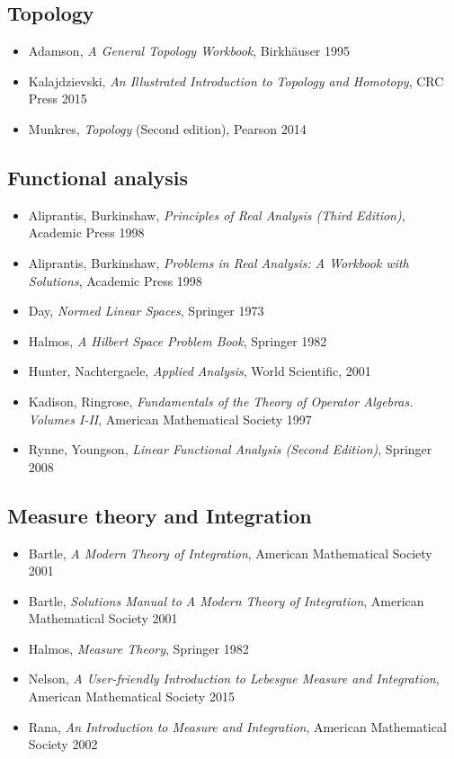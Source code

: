 \subsection*{Topology}

\begin{itemize}
\item Adamson, \textit{A General Topology Workbook}, Birkh\"auser 1995
\item Kalajdzievski, \textit{An Illustrated Introduction to Topology and Homotopy}, CRC Press 2015
\item Munkres, \textit{Topology} (Second edition), Pearson 2014
\end{itemize}


\subsection*{Functional analysis}

\begin{itemize}
\item Aliprantis, Burkinshaw, \textit{Principles of Real Analysis (Third Edition)}, Academic Press 1998
\item Aliprantis, Burkinshaw, \textit{Problems in Real Analysis: A Workbook with Solutions}, Academic Press 1998
\item Day, \textit{Normed Linear Spaces}, Springer 1973
\item Halmos, \textit{A Hilbert Space Problem Book}, Springer 1982
\item Hunter, Nachtergaele, \textit{Applied Analysis}, World Scientific, 2001
\item Kadison, Ringrose, \textit{Fundamentals of the Theory of Operator Algebras. Volumes I-II}, American Mathematical Society 1997
\item Rynne, Youngson, \textit{Linear Functional Analysis (Second Edition)}, Springer 2008
\end{itemize}


\subsection*{Measure theory and Integration}

\begin{itemize}
\item Bartle, \textit{A Modern Theory of Integration}, American Mathematical Society 2001
\item Bartle, \textit{Solutions Manual to A Modern Theory of Integration}, American Mathematical Society 2001
\item Halmos, \textit{Measure Theory}, Springer 1982
\item Nelson, \textit{A User-friendly Introduction to Lebesgue Measure and Integration}, American Mathematical Society 2015
\item Rana, \textit{An Introduction to Measure and Integration}, American Mathematical Society 2002
\end{itemize}





